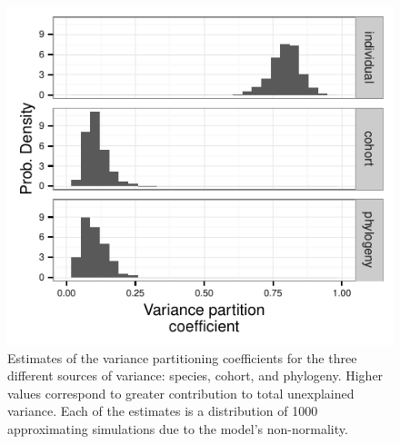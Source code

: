 \documentclass[12pt,letterpaper]{article}
\begin{document}
\begin{figure}[ht]
  \centering
  \includegraphics[height = 0.5\textheight, width = \textwidth, keepaspectratio = true]{figure/variance_est}
  \caption{Estimates of the variance partitioning coefficients for the three different sources of variance: species, cohort, and phylogeny. Higher values correspond to greater contribution to total unexplained variance. Each of the estimates is a distribution of 1000 approximating simulations due to the model's non-normality.}
  \label{fig:vpc}
\end{figure}
\end{document}
